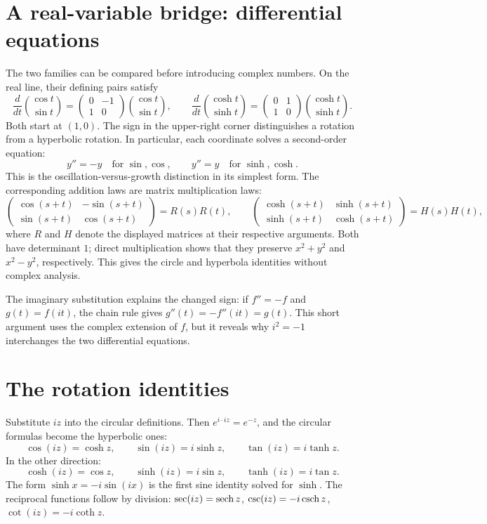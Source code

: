 \documentclass{essay}
\begin{document}
\section{A real-variable bridge: differential equations}

The two families can be compared before introducing complex numbers. On the
real line, their defining pairs satisfy
\[
  \frac{d}{dt}\binom{\cos t}{\sin t}
    = \begin{pmatrix}0&-1\\1&0\end{pmatrix}
      \binom{\cos t}{\sin t},
  \qquad
  \frac{d}{dt}\binom{\cosh t}{\sinh t}
    = \begin{pmatrix}0&1\\1&0\end{pmatrix}
      \binom{\cosh t}{\sinh t}.
\]
Both start at $(1,0)$. The sign in the upper-right corner distinguishes a
rotation from a hyperbolic rotation. In particular, each coordinate solves a
second-order equation:
\[
  y''=-y \quad\text{for }\sin,\cos,
  \qquad
  y''=y \quad\text{for }\sinh,\cosh.
\]
This is the oscillation-versus-growth distinction in its simplest form. The
corresponding addition laws are matrix multiplication laws:
\[
  \begin{pmatrix}\cos(s+t)&-\sin(s+t)\\
                  \sin(s+t)&\cos(s+t)\end{pmatrix}
  = R(s)R(t),
  \qquad
  \begin{pmatrix}\cosh(s+t)&\sinh(s+t)\\
                  \sinh(s+t)&\cosh(s+t)\end{pmatrix}
  = H(s)H(t),
\]
where $R$ and $H$ denote the displayed matrices at their respective arguments.
Both have determinant $1$; direct multiplication shows that they preserve
$x^2+y^2$ and $x^2-y^2$, respectively.
This gives the circle and hyperbola identities without complex analysis.

The imaginary substitution explains the changed sign: if $f''=-f$ and
$g(t)=f(it)$, the chain rule gives $g''(t)=-f''(it)=g(t)$. This short argument
uses the complex extension of $f$, but it reveals why $i^2=-1$ interchanges
the two differential equations.

\section{The rotation identities}

Substitute $iz$ into the circular definitions. Then $e^{i \cdot iz} = e^{-z}$,
and the circular formulas become the hyperbolic ones:
\[
  \cos(iz) = \cosh z, \qquad
  \sin(iz) = i \sinh z, \qquad
  \tan(iz) = i \tanh z .
\]
In the other direction:
\[
  \cosh(iz) = \cos z, \qquad
  \sinh(iz) = i \sin z, \qquad
  \tanh(iz) = i \tan z .
\]
The form $\sinh x = -i \sin(ix)$ is the first sine identity solved for $\sinh$.
The reciprocal functions follow by division: $\sec(iz) = \operatorname{sech} z$,
$\csc(iz) = -i \operatorname{csch} z$, $\cot(iz) = -i \coth z$.
\end{document}
